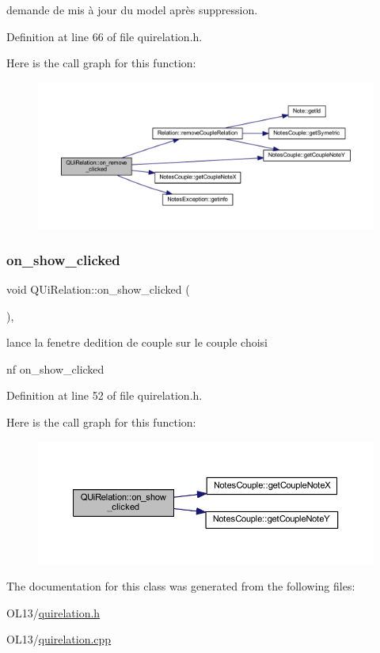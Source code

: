 demande de mis à jour du model après suppression. 

Definition at line 66 of file quirelation.\+h.

Here is the call graph for this function\+:\nopagebreak
\begin{figure}[H]
\begin{center}
\leavevmode
\includegraphics[width=350pt]{class_q_ui_relation_a14fddadaa70fa8c82a0e49a547e2f6b5_cgraph}
\end{center}
\end{figure}
\mbox{\label{class_q_ui_relation_a66b413fb02bae1c7ce504395655cd47f}} 
\subsubsection{\texorpdfstring{on\+\_\+show\+\_\+clicked}{on\_show\_clicked}}
{\footnotesize\ttfamily void Q\+Ui\+Relation\+::on\+\_\+show\+\_\+clicked (\begin{DoxyParamCaption}{ }\end{DoxyParamCaption})\hspace{0.3cm}{\ttfamily [inline]}, {\ttfamily [slot]}}



lance la fenetre d\textquotesingle{}edition de couple sur le couple choisi 

nf on\+\_\+show\+\_\+clicked 

Definition at line 52 of file quirelation.\+h.

Here is the call graph for this function\+:\nopagebreak
\begin{figure}[H]
\begin{center}
\leavevmode
\includegraphics[width=350pt]{class_q_ui_relation_a66b413fb02bae1c7ce504395655cd47f_cgraph}
\end{center}
\end{figure}


The documentation for this class was generated from the following files\+:\begin{DoxyCompactItemize}
\item 
O\+L13/\hyperlink{quirelation_8h}{quirelation.\+h}\item 
O\+L13/\hyperlink{quirelation_8cpp}{quirelation.\+cpp}\end{DoxyCompactItemize}
